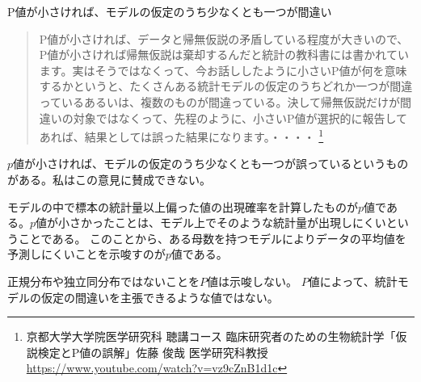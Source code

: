 \begin{SMbox}{P値が小さければ、モデルの仮定のうち少なくとも一つが間違い}
    \ 
    \begin{quote}
        P値が小さければ、データと帰無仮説の矛盾している程度が大きいので、P値が小さければ帰無仮説は棄却するんだと統計の教科書には書かれています。実はそうではなくって、今お話ししたように小さいP値が何を意味するかというと、たくさんある統計モデルの仮定のうちどれか一つが間違っているあるいは、複数のものが間違っている。決して帰無仮説だけが間違いの対象ではなくって、先程のように、小さいP値が選択的に報告してあれば、結果としては誤った結果になります。・・・・
        \footnote{京都大学大学院医学研究科 聴講コース 臨床研究者のための生物統計学「仮説検定とP値の誤解」佐藤 俊哉 医学研究科教授 \url{https://www.youtube.com/watch?v=vz9cZnB1d1c} }
    \end{quote}
    $p$値が小さければ、モデルの仮定のうち少なくとも一つが誤っているというものがある。私はこの意見に賛成できない。

    モデルの中で標本の統計量以上偏った値の出現確率を計算したものが$p$値である。$p$値が小さかったことは、モデル上でそのような統計量が出現しにくいということである。
    このことから、ある母数を持つモデルによりデータの平均値を予測しにくいことを示唆すのが$p$値である。

    正規分布や独立同分布ではないことを$P$値は示唆しない。
    $P$値によって、統計モデルの仮定の間違いを主張できるような値ではない。
\end{SMbox}


